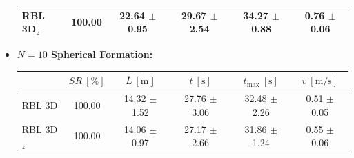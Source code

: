 \begin{itemize}
\begin{table}[H]
\begin{tabular}{|l|c|c|c|c|c|}
                    RBL \ac{3D}\(_z\)                & 100.00          & 22.64 $\pm$ 0.95                  & 29.67 $\pm$ 2.54                  & 34.27 $\pm$ 0.88                               & 0.76 $\pm$ 0.06                         \\ \hline
                    \end{tabular}
                \end{table}
            \item \textbf{$N = 10$ Spherical Formation:}
                \begin{table}[H]
                    \centering
                    \renewcommand{\arraystretch}{1.2}
                    \begin{tabular}{|l|c|c|c|c|c|}
                    \hline
                                                & \( SR \ [\%] \) & \( \overline{L} \ [\mathrm{m}] \) & \( \overline{t} \ [\mathrm{s}] \) & \( \overline{t}_{\text{max}} \ [\mathrm{s}] \) & \( \overline{v} \ [\mathrm{m/s}] \)     \\ \hline
                    RBL \ac{3D}                      & 100.00          & 14.32 $\pm$ 1.52                  & 27.76 $\pm$ 3.06                  & 32.48 $\pm$ 2.26                               & 0.51 $\pm$ 0.05                         \\ \hline
                    RBL \ac{3D}\(_z\)                & 100.00          & 14.06 $\pm$ 0.97                  & 27.17 $\pm$ 2.66                  & 31.86 $\pm$ 1.24                               & 0.55 $\pm$ 0.06                         \\ \hline
                    \end{tabular}
                \end{table}
        \end{itemize}

